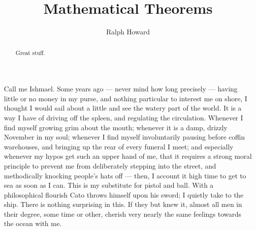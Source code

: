 \documentclass{amsart}
\theoremstyle{definition}
\theoremstyle{remark}
\numberwithin{equation}{section}
\begin{document}

\title{Mathematical Theorems}


\author{Ralph Howard}
\address{Department of Mathematics, University of South Carolina, 
Columbia, SC 29208}





\begin{abstract}
Great stuff.
\end{abstract}


\maketitle





Call me Ishmael. Some years ago --- never mind how long precisely ---
having little or no money in my purse, and nothing particular to
interest me on shore, I thought I would sail about a little and see
the watery part of the world. It is a way I have of driving off the
spleen, and regulating the circulation.  Whenever I find myself
growing grim about the mouth; whenever it is a damp, drizzly November
in my soul; whenever I find myself involuntarily pausing before coffin
warehouses, and bringing up the rear of every funeral I meet; and
especially whenever my hypos get such an upper hand of me, that it
requires a strong moral principle to prevent me from deliberately
stepping into the street, and methodically knocking people's hats off
--- then, I account it high time to get to sea as soon as I can. This
is my substitute for pistol and ball. With a philosophical flourish
Cato throws himself upon his sword; I quietly take to the ship. There
is nothing surprising in this. If they but knew it, almost all men in
their degree, some time or other, cherish very nearly the same
feelings towards the ocean with me.
\end{document}
